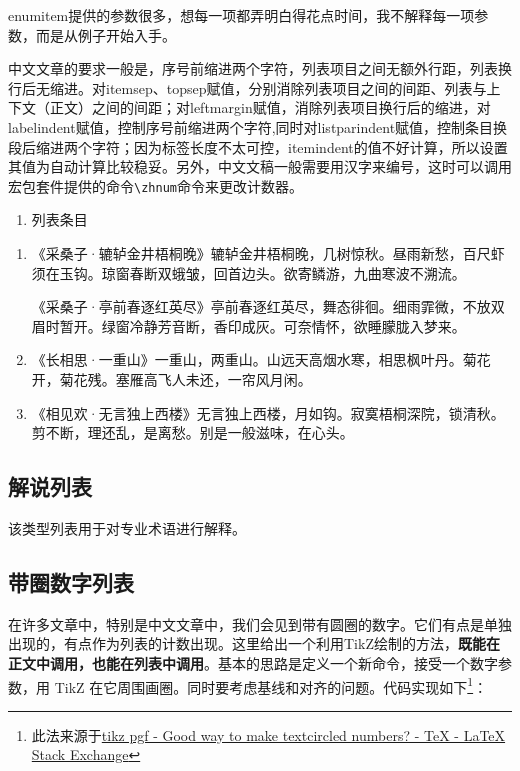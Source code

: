 enumitem提供的参数很多，想每一项都弄明白得花点时间，我不解释每一项参数，而是从例子开始入手。

中文文章的要求一般是，序号前缩进两个字符，列表项目之间无额外行距，列表换行后无缩进。对itemsep、topsep赋值，分别消除列表项目之间的间距、列表与上下文（正文）之间的间距；对leftmargin赋值，消除列表项目换行后的缩进，对labelindent赋值，控制序号前缩进两个字符,同时对listparindent赋值，控制条目换段后缩进两个字符；因为标签长度不太可控，itemindent的值不好计算，所以设置其值为自动计算比较稳妥。另外，中文文稿一般需要用汉字来编号，这时可以调用\CTeX{}宏包套件提供的命令\lstinline|\zhnum|命令来更改计数器。

\begin{latex}
\begin{enumerate}[label=(\zhnum*),itemsep=0pt,parsep=0pt,topsep=0pt,leftmargin=0pt,labelindent=\parindent,listparindent=\parindent,itemindent=*]
\item 列表条目
\end{enumerate}
\end{latex}

\begin{enumerate}[label=(\zhnum*),itemsep=0pt,parsep=0pt,topsep=0pt,leftmargin=0pt,labelindent=\parindent,listparindent=\parindent,itemindent=*]
\item 《采桑子·辘轳金井梧桐晚》辘轳金井梧桐晚，几树惊秋。昼雨新愁，百尺虾须在玉钩。琼窗春断双蛾皱，回首边头。欲寄鳞游，九曲寒波不溯流。\par
《采桑子·亭前春逐红英尽》亭前春逐红英尽，舞态徘徊。细雨霏微，不放双眉时暂开。绿窗冷静芳音断，香印成灰。可奈情怀，欲睡朦胧入梦来。
\item 《长相思·一重山》一重山，两重山。山远天高烟水寒，相思枫叶丹。菊花开，菊花残。塞雁高飞人未还，一帘风月闲。 
\item 《相见欢·无言独上西楼》无言独上西楼，月如钩。寂寞梧桐深院，锁清秋。剪不断，理还乱，是离愁。别是一般滋味，在心头。
\end{enumerate}

\subsection{解说列表}
该类型列表用于对专业术语进行解释。

\subsection{带圈数字列表}

在许多文章中，特别是中文文章中，我们会见到带有圆圈的数字。它们有点是单独出现的，有点作为列表的计数出现。这里给出一个利用TikZ绘制的方法，\textbf{既能在正文中调用，也能在列表中调用}。基本的思路是定义一个新命令，接受一个数字参数，用 TikZ 在它周围画圈。同时要考虑基线和对齐的问题。代码实现如下\footnote{此法来源于\href{http://tex.stackexchange.com/questions/7032/good-way-to-make-textcircled-numbers}{tikz pgf - Good way to make textcircled numbers? - TeX - LaTeX Stack Exchange}}：

